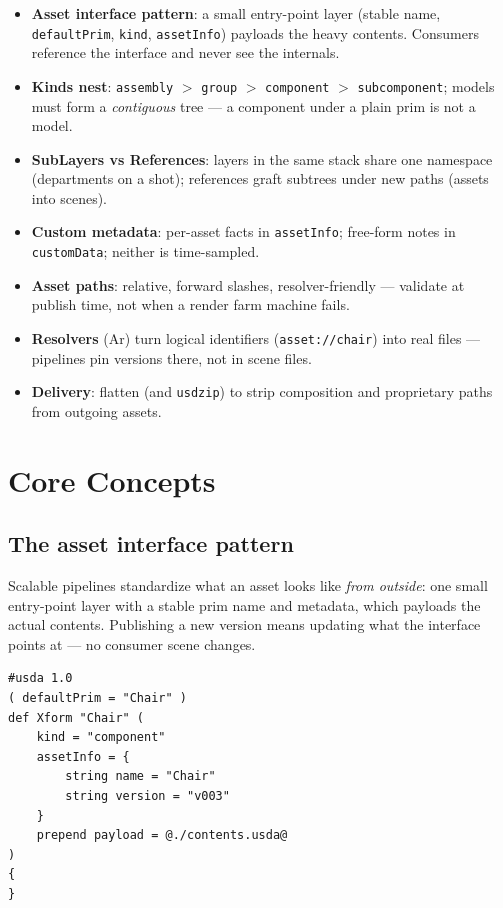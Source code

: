 \CheatSheetTitle
\begin{itemize}[leftmargin=*]
  \item \textbf{Asset interface pattern}: a small entry-point layer (stable
        name, \texttt{defaultPrim}, \texttt{kind}, \texttt{assetInfo})
        payloads the heavy contents. Consumers reference the interface and
        never see the internals.
  \item \textbf{Kinds nest}: \texttt{assembly} $>$ \texttt{group} $>$
        \texttt{component} $>$ \texttt{subcomponent}; models must form a
        \emph{contiguous} tree --- a component under a plain prim is not a
        model.
  \item \textbf{SubLayers vs References}: layers in the same stack share one
        namespace (departments on a shot); references graft subtrees under
        new paths (assets into scenes).
  \item \textbf{Custom metadata}: per-asset facts in \texttt{assetInfo};
        free-form notes in \texttt{customData}; neither is time-sampled.
  \item \textbf{Asset paths}: relative, forward slashes, resolver-friendly ---
        validate at publish time, not when a render farm machine fails.
  \item \textbf{Resolvers} (Ar) turn logical identifiers
        (\texttt{asset://chair}) into real files --- pipelines pin versions
        there, not in scene files.
  \item \textbf{Delivery}: flatten (and \texttt{usdzip}) to strip composition
        and proprietary paths from outgoing assets.
\end{itemize}

\section{Core Concepts}

\subsection{The asset interface pattern}\label{sec:pd-iface}
Scalable pipelines standardize what an asset looks like \emph{from outside}:
one small entry-point layer with a stable prim name and metadata, which
payloads the actual contents. Publishing a new version means updating what
the interface points at --- no consumer scene changes.

\begin{lstlisting}
#usda 1.0
( defaultPrim = "Chair" )
def Xform "Chair" (
    kind = "component"
    assetInfo = {
        string name = "Chair"
        string version = "v003"
    }
    prepend payload = @./contents.usda@
)
{
}
\end{lstlisting}


